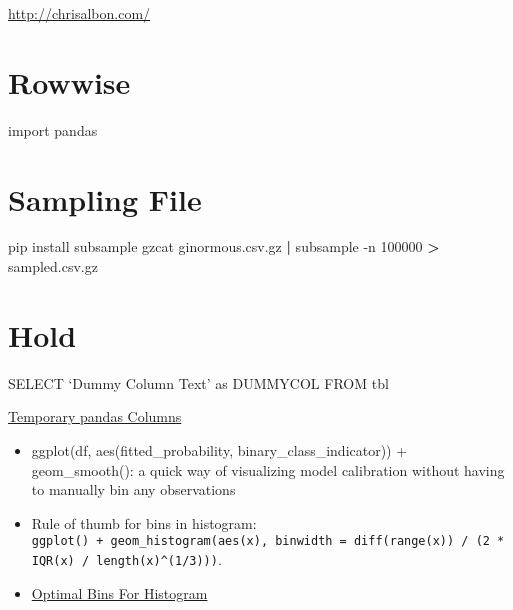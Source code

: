 \documentclass[]{book}
\newenvironment{Shaded}{\begin{snugshade}}{\end{snugshade}}
\newcommand{\KeywordTok}[1]{\textcolor[rgb]{0.13,0.29,0.53}{\textbf{#1}}}
\newcommand{\DataTypeTok}[1]{\textcolor[rgb]{0.13,0.29,0.53}{#1}}
\newcommand{\StringTok}[1]{\textcolor[rgb]{0.31,0.60,0.02}{#1}}
\newcommand{\ImportTok}[1]{#1}
\newcommand{\OperatorTok}[1]{\textcolor[rgb]{0.81,0.36,0.00}{\textbf{#1}}}
\newcommand{\ExtensionTok}[1]{#1}
\newcommand{\NormalTok}[1]{#1}
\begin{document}
\url{http://chrisalbon.com/}

\section{Rowwise}\label{rowwise}

\begin{Shaded}
\end{Shaded}

\begin{Shaded}
\begin{Highlighting}[]
\ImportTok{import}\NormalTok{ pandas}
\end{Highlighting}
\end{Shaded}

\section{Sampling File}\label{sampling-file}

\begin{Shaded}
\begin{Highlighting}[]
\ExtensionTok{pip}\NormalTok{ install subsample}
\ExtensionTok{gzcat}\NormalTok{ ginormous.csv.gz }\KeywordTok{|} \ExtensionTok{subsample}\NormalTok{ -n 100000 }\OperatorTok{>}\NormalTok{ sampled.csv.gz}
\end{Highlighting}
\end{Shaded}

\section{Hold}\label{hold}

SELECT `Dummy Column Text' as DUMMYCOL FROM tbl

\href{https://github.com/jreback/PyDataNYC2015/blob/master/whats-new-in-pandas/v0.16.x.ipynb}{Temporary
pandas Columns}

\begin{itemize}
\item
  ggplot(df, aes(fitted\_probability, binary\_class\_indicator)) +
  geom\_smooth(): a quick way of visualizing model calibration without
  having to manually bin any observations
\item
  Rule of thumb for bins in histogram:
  \texttt{ggplot()\ +\ geom\_histogram(aes(x),\ binwidth\ =\ diff(range(x))\ /\ (2\ *\ IQR(x)\ /\ length(x)\^{}(1/3)))}.
\item
  \href{https://stats.stackexchange.com/questions/798/calculating-optimal-number-of-bins-in-a-histogram/862\#862}{Optimal
  Bins For Histogram}
\end{itemize}
\end{document}
